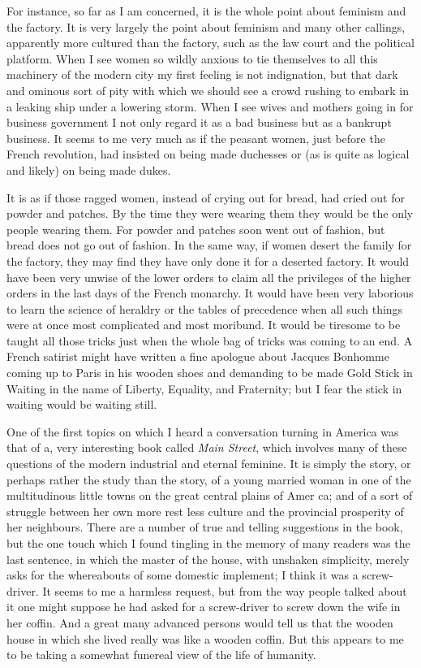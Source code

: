 \documentclass{book}
\begin{document}
For instance, so far as I am concerned, it is the whole point about feminism and the factory. It is very largely the point about feminism and many other callings, apparently more cultured than the factory, such as the law court and the political platform. When I see women so wildly anxious to tie themselves to all this machinery of the modern city my first feeling is not indignation, but that dark and ominous sort of pity with which we should see a crowd rushing to embark in a leaking ship under a lowering storm. When I see wives and mothers going in for business government I not only regard it as a bad business but as a bankrupt business. It seems to me very much as if the peasant women, just before the French revolution, had insisted on being made duchesses or (as is quite as logical and likely) on being made dukes.

It is as if those ragged women, instead of crying out for bread, had cried out for powder and patches. By the time they were wearing them they would be the only people wearing them. For powder and patches soon went out of fashion, but bread does not go out of fashion. In the same way, if women desert the family for the factory, they may find they have only done it for a deserted factory. It would have been very unwise of the lower orders to claim all the privileges of the higher orders in the last days of the French monarchy. It would have been very laborious to learn the science of heraldry or the tables of precedence when all such things were at once most complicated and most moribund. It would be tiresome to be taught all those tricks just when the whole bag of tricks was coming to an end. A French satirist might have written a fine apologue about Jacques Bonhomme coming up to Paris in his wooden shoes and demanding to be made Gold Stick in Waiting in the name of Liberty, Equality, and Fraternity; but I fear the stick in waiting would be waiting still.

One of the first topics on which I heard a conversation turning in America was that of a, very interesting book called \emph{Main Street}, which involves many of these questions of the modern industrial and eternal feminine. It is simply the story, or perhaps rather the study than the story, of a young married woman in one of the multitudinous little towns on the great central plains of Amer ca; and of a sort of struggle between her own more rest less culture and the provincial prosperity of her neighbours. There are a number of true and telling suggestions in the book, but the one touch which I found tingling in the memory of many readers was the last sentence, in which the master of the house, with unshaken simplicity, merely asks for the whereabouts of some domestic implement; I think it was a screw-driver. It seems to me a harmless request, but from the way people talked about it one might suppose he had asked for a screw-driver to screw down the wife in her coffin. And a great many advanced persons would tell us that the wooden house in which she lived really was like a wooden coffin. But this appears to me to be taking a somewhat funereal view of the life of humanity.
\end{document}

